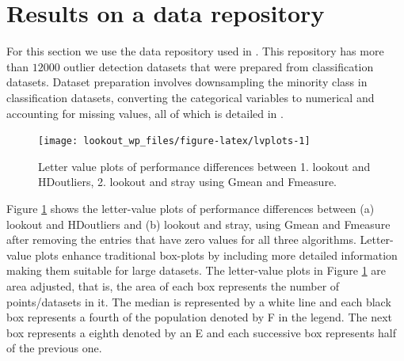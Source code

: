 \documentclass[11pt,a4paper,]{article}
\theoremstyle{definition}
\theoremstyle{definition}
\theoremstyle{definition}
\theoremstyle{remark}
\begin{document}
\hypertarget{sec:applications}{%
\section{Results on a data repository}\label{sec:applications}}

For this section we use the data repository used in \textcite{datasets}. This repository has more than \(12000\) outlier detection datasets that were prepared from classification datasets. Dataset preparation involves downsampling the minority class in classification datasets, converting the categorical variables to numerical and accounting for missing values, all of which is detailed in \textcite{normalizationoutliers}.

\begin{figure}
\texttt{[image: lookout\_wp\_files/figure-latex/lvplots-1]} \caption{Letter value plots of performance differences between 1. lookout and HDoutliers, 2. lookout and stray using Gmean and Fmeasure.}\label{fig:lvplots}
\end{figure}

Figure \ref{fig:lvplots} shows the letter-value plots \autocite{lvplots} of performance differences between
(a) lookout and HDoutliers and
(b) lookout and stray,
using Gmean and Fmeasure after removing the entries that have zero values for all three algorithms. Letter-value plots enhance traditional box-plots by including more detailed information making them suitable for large datasets. The letter-value plots in Figure \ref{fig:lvplots} are area adjusted, that is, the area of each box represents the number of points/datasets in it. The median is represented by a white line and each black box represents a fourth of the population denoted by F in the legend. The next box represents a eighth denoted by an E and each successive box represents half of the previous one.
\end{document}
